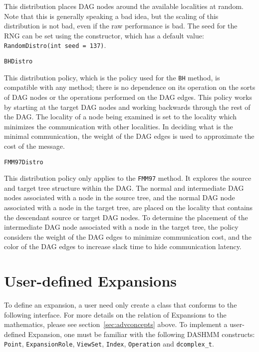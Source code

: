\noindent This distribution places DAG nodes around the available localities at
random. Note that this is generally speaking a bad idea, but the scaling of
this distribution is not bad, even if the raw performance is bad. The seed for
the RNG can be set using the constructor, which has a default value:
\texttt{RandomDistro(int seed = 137)}.

\begin{lstlisting}
BHDistro
\end{lstlisting}

\noindent This distribution policy, which is the policy used for the
\texttt{BH} method, is compatible with any method; there is no dependence on
its operation on the sorts of DAG nodes or the operations performed on the DAG
edges. This policy works by starting at the target DAG nodes and working
backwards through the rest of the DAG. The locality of a node being examined is
set to the locality which minimizes the communication with other localities.
In deciding what is the minimal communication, the weight of the DAG edges is
used to approximate the cost of the message.

\begin{lstlisting}
FMM97Distro
\end{lstlisting}

\noindent This distribution policy only applies to the \texttt{FMM97} method.
It explores the source and target tree structure within the DAG. The normal
and intermediate DAG nodes associated with a node in the source tree, and
the normal DAG node associated with a node in the target tree, are placed on
the locality that contains the descendant source or target DAG nodes. To
determine the placement of the intermediate DAG node associated with a node
in the target tree, the policy considers the weight of the DAG edges to
minimize communication cost, and the color of the DAG edges to increase slack
time to hide communication latency.


\section{User-defined Expansions}

To define an expansion, a user need only create a class that conforms to the
following interface. For more details on the relation of Expansions to the
mathematics, please see section~\ref{sec:advconcepts} above. To implement a
user-defined Expansion, one must be familiar with the following DASHMM
constructs: \texttt{Point}, \texttt{ExpansionRole}, \texttt{ViewSet},
\texttt{Index}, \texttt{Operation} and \texttt{dcomplex\_t}.

